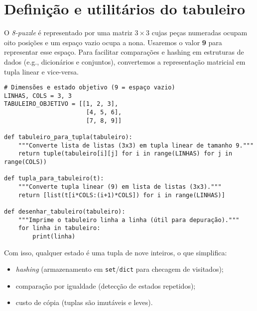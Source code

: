 
\section{Definição e utilitários do tabuleiro}

O \emph{8-puzzle} é representado por uma matriz $3\times 3$ cujas peças numeradas ocupam oito posições e um espaço vazio ocupa a nona. Usaremos o valor \textbf{9} para representar esse espaço. Para facilitar comparações e hashing em estruturas de dados (e.g., dicionários e conjuntos), convertemos a representação matricial em tupla linear e vice-versa.

\begin{verbatim}
# Dimensões e estado objetivo (9 = espaço vazio)
LINHAS, COLS = 3, 3
TABULEIRO_OBJETIVO = [[1, 2, 3],
                       [4, 5, 6],
                       [7, 8, 9]]

def tabuleiro_para_tupla(tabuleiro):
    """Converte lista de listas (3x3) em tupla linear de tamanho 9."""
    return tuple(tabuleiro[i][j] for i in range(LINHAS) for j in range(COLS))

def tupla_para_tabuleiro(t):
    """Converte tupla linear (9) em lista de listas (3x3)."""
    return [list(t[i*COLS:(i+1)*COLS]) for i in range(LINHAS)]

def desenhar_tabuleiro(tabuleiro):
    """Imprime o tabuleiro linha a linha (útil para depuração)."""
    for linha in tabuleiro:
        print(linha)
\end{verbatim}

\noindent
Com isso, qualquer estado é uma tupla de nove inteiros, o que simplifica:
\begin{itemize}[leftmargin=*,itemsep=0pt]
  \item \emph{hashing} (armazenamento em \texttt{set}/\texttt{dict} para checagem de visitados);
  \item comparação por igualdade (detecção de estados repetidos);
  \item custo de cópia (tuplas são imutáveis e leves).
\end{itemize}

